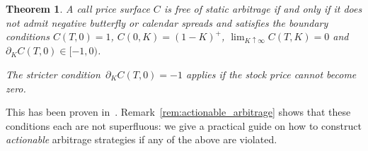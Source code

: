 \documentclass[11pt,a4paper]{article}
\newtheorem{theorem}[definition]{Theorem}
\begin{document}
\begin{theorem}\label{th:arbfree}
A call price surface $C$ is free of static arbitrage if and only if 
it does not admit negative butterfly or calendar
spreads and satisfies the boundary conditions
$C(T,0)=1$, $C(0,K)=(1-K)^+$, $\lim_{K\uparrow\infty} C(T,K)=0$ and $\partial_K C(T,0)\in[-1,0)$.

The stricter condition~$\partial_K C(T,0)=-1$ applies if the stock price cannot become zero.
\end{theorem}

This has been proven in~\cite{buehler2006expensive}. Remark~\ref{rem:actionable_arbitrage} 
shows that these conditions each are not superfluous: we give a practical
guide on how to construct \emph{actionable} arbitrage strategies if any of the above
are violated. 
\end{document}
